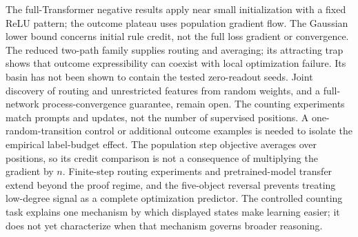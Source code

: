 The full-Transformer negative results apply near small initialization with a fixed
ReLU pattern; the outcome plateau uses population gradient flow.
The Gaussian lower bound concerns initial rule credit, not the full loss gradient
or convergence. The reduced two-path family supplies routing and averaging;
its attracting trap shows that outcome expressibility can coexist with local
optimization failure. Its basin has not been shown to contain the tested
zero-readout seeds. Joint discovery of routing and unrestricted features from
random weights, and a full-network process-convergence guarantee, remain open.
The counting experiments match prompts and updates, not the number of supervised
positions. A one-random-transition control or additional outcome examples is needed
to isolate the empirical label-budget effect. The population step objective averages
over positions, so its credit comparison is not a consequence of multiplying the gradient by $n$.
Finite-step routing experiments and pretrained-model transfer extend beyond the proof regime,
and the five-object reversal prevents treating low-degree signal as a complete optimization
predictor. The controlled counting task explains one mechanism by which displayed states
make learning easier; it does not yet characterize when that mechanism governs broader reasoning.
